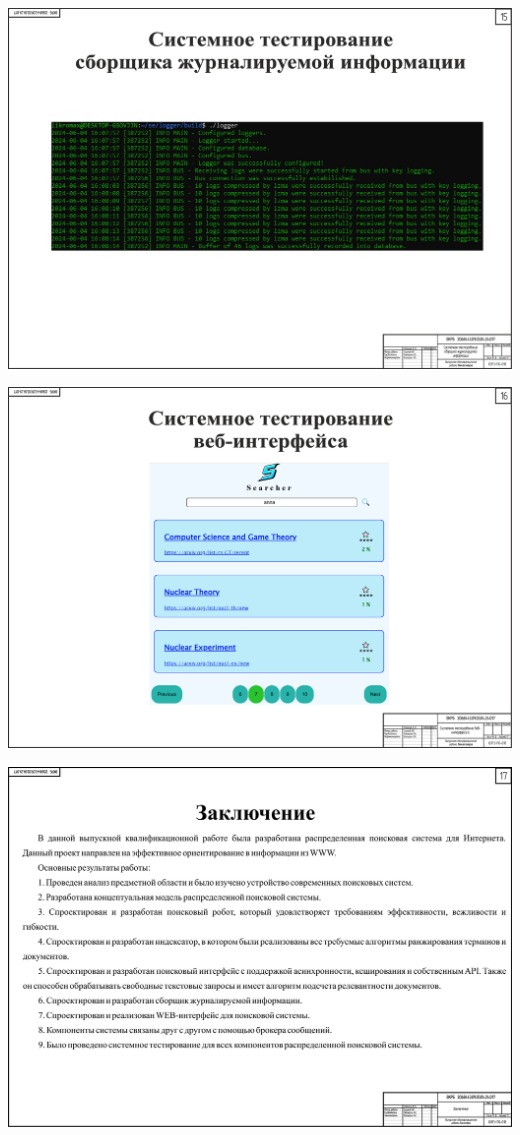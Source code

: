 \begin{landscape}
\begin{плакат}
    \includegraphics[width=0.82\linewidth]{posters/ptl.eps}
    \label{ptl:image}      
\end{плакат}

\begin{плакат}
    \includegraphics[width=0.82\linewidth]{posters/ptw.eps}
    \label{ptw:image}      
\end{плакат}

\begin{плакат}
    \includegraphics[width=0.82\linewidth]{posters/p6.eps}
    \label{p6:image}      
\end{плакат}

\end{landscape}